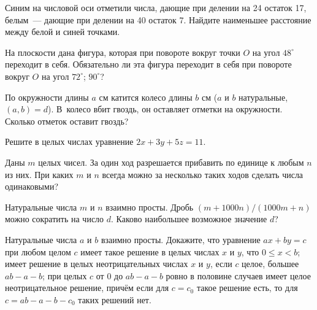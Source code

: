 \documentclass[a4paper,11pt]{article}
\begin{document}
 Синим на числовой оси отметили числа,
дающие при делении на 24 остаток 17, белым~--- дающие
при делении на 40 остаток 7.
Найдите наименьшее расстояние между белой и синей точками.



 На плоскости дана фигура, которая
при повороте вокруг точки $O$ на угол $48^\circ$
переходит в себя.
Обязательно ли эта фигура переходит в себя при повороте
вокруг $O$ на угол
 $72^\circ$;
 $90^\circ$?


По окружности длины $a$ см катится колесо длины $b$ см
($a$ и $b$ натуральные,~\hbox{$(a,b)=d$).}
В~колесо вбит гвоздь, он оставляет отметки на окружности.
Сколько отметок оставит гвоздь?



Решите в целых числах уравнение $2x+3y+5z=11$.

Даны $m$ целых чисел. За один ход разрешается прибавить
по единице к любым $n$ из них. При каких $m$ и $n$ всегда можно
за несколько таких ходов сделать числа одинаковыми?

Натуральные числа $m$ и $n$ взаимно просты.
Дробь $(m + 1000n)/(1000m+n)$
можно сократить на число $d$. Каково наибольшее  возможное значение $d$?

Натуральные числа $a$ и $b$ взаимно просты. %
Докажите, что уравнение $ax+by=c$
при любом целом $c$
имеет такое решение в целых числах $x$ и $y$, что $0\leq x<b$;
имеет решение в целых неотрицательных числах $x$ и $y$, если
$c$ целое, большее $ab-a-b$;
при целых $c$ от 0 до $ab-a-b$ ровно в половине случаев
имеет целое неотрицательное решение,
прич\"ем если для %
$c=c_0$
такое решение есть, то для
$c=ab-a-b-c_0$ таких решений нет.




\end{document}
